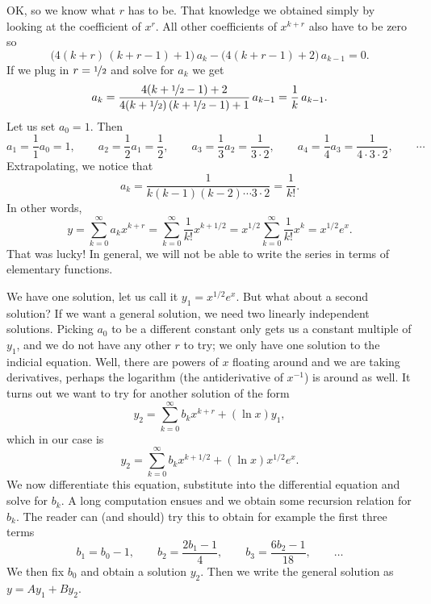 \begin{example}
OK\@, so we know what $r$ has to be.  That knowledge we obtained simply by looking
at the coefficient of $x^r$.  All other
coefficients of $x^{k+r}$ also have to be zero so
\begin{equation*}
\bigl( 4 (k+r)\,(k+r-1) + 1 \bigr) \, a_k
-
\bigl( 4 (k+r-1) + 2 \bigr) \, a_{k-1} = 0 .
\end{equation*}
If we plug in $r=\nicefrac{1}{2}$ and solve for $a_k$ we get
\begin{equation*}
a_k
=
\frac{4 (k+\nicefrac{1}{2}-1) + 2}{4 (k+\nicefrac{1}{2})\,(k+\nicefrac{1}{2}-1) + 1} \, a_{k-1}
=
\frac{1}{k} \, a_{k-1} .
\end{equation*}
Let us set $a_0 = 1$.  Then
\begin{equation*}
a_1 = \frac{1}{1} a_0 = 1 ,
\qquad
a_2 = \frac{1}{2} a_1 = \frac{1}{2} ,
\qquad
a_3 = \frac{1}{3} a_2 = \frac{1}{3 \cdot 2} ,
\qquad
a_4 = \frac{1}{4} a_3 = \frac{1}{4 \cdot 3 \cdot 2} ,
\qquad \cdots
\end{equation*}
Extrapolating, we notice that
\begin{equation*}
a_k = \frac{1}{k(k-1)(k-2) \cdots 3 \cdot 2} = \frac{1}{k!} .
\end{equation*}
In other words,
\begin{equation*}
y = 
\sum_{k=0}^\infty a_k x^{k+r}
=
\sum_{k=0}^\infty \frac{1}{k!} x^{k+1/2}
=
x^{1/2}
\sum_{k=0}^\infty \frac{1}{k!} x^{k}
=
x^{1/2}
e^x .
\end{equation*}
That was lucky!  In general, we will not be able to write the series in
terms of elementary functions.

We have one solution, let us call it $y_1 = x^{1/2} e^x$.
But what about a second solution?  If
we want a general solution, we need two linearly independent solutions.
Picking $a_0$ to be a different constant only gets us a constant
multiple of $y_1$, and we do not have any other $r$ to try; we only
have one solution to the indicial equation.  Well, there are powers of $x$
floating around and we are taking derivatives, perhaps the logarithm (the
antiderivative of $x^{-1}$) is around as well.  It turns out we want to
try for another solution of the form
\begin{equation*}
y_2 = \sum_{k=0}^\infty b_k x^{k+r} + (\ln x) y_1 ,
\end{equation*}
which in our case is
\begin{equation*}
y_2 = \sum_{k=0}^\infty b_k x^{k+1/2} + (\ln x) x^{1/2} e^x .
\end{equation*}
We now differentiate this equation, substitute into the differential
equation and solve for $b_k$.  A long computation ensues and we
obtain some recursion relation for $b_k$.  The reader
can (and should) try this to obtain for example the first three terms
\begin{equation*}
b_1 = b_0 -1 , \qquad b_2 = \frac{2b_1-1}{4} , \qquad b_3 =
\frac{6b_2-1}{18} , \qquad \ldots
\end{equation*}
We then fix $b_0$ and obtain a solution $y_2$.  Then
we write the general solution as $y = A y_1 + B y_2$.
\end{example}

